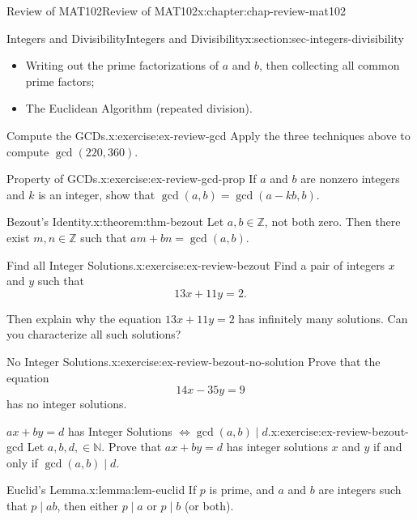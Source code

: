 \documentclass[oneside,10pt,]{book}
\numberwithin{equation}{section}
\begin{document}
\begin{chapterptx}{Review of MAT102}{}{Review of MAT102}{}{}{x:chapter:chap-review-mat102}
\begin{sectionptx}{Integers and Divisibility}{}{Integers and Divisibility}{}{}{x:section:sec-integers-divisibility}
\begin{itemize}[label=\textbullet]
\item{}Writing out the prime factorizations of \(a\) and \(b\), then collecting all common prime factors;%
\item{}The Euclidean Algorithm (repeated division).%
\end{itemize}
%
\begin{inlineexercise}{Compute the GCDs.}{x:exercise:ex-review-gcd}%
Apply the three techniques above to compute \(\gcd(220,360)\).%
\end{inlineexercise}
\begin{inlineexercise}{Property of GCDs.}{x:exercise:ex-review-gcd-prop}%
If \(a\) and \(b\) are nonzero integers and \(k\) is an integer, show that \(\gcd(a,b) = \gcd(a-kb,b)\).%
\end{inlineexercise}
\begin{theorem}{Bezout's Identity.}{}{x:theorem:thm-bezout}%
Let \(a,b \in \mathbb{Z}\), not both zero. Then there exist \(m,n \in \mathbb{Z}\) such that \(am + bn = \gcd(a,b)\).%
\end{theorem}
\begin{inlineexercise}{Find all Integer Solutions.}{x:exercise:ex-review-bezout}%
Find a pair of integers \(x\) and \(y\) such that%
\begin{equation*}
13x + 11y = 2\text{.}
\end{equation*}
%
\par
Then explain why the equation \(13x + 11y = 2\) has infinitely many solutions. Can you characterize all such solutions?%
\end{inlineexercise}
\begin{inlineexercise}{No Integer Solutions.}{x:exercise:ex-review-bezout-no-solution}%
Prove that the equation%
\begin{equation*}
14x - 35y = 9
\end{equation*}
has no integer solutions.%
\end{inlineexercise}
\begin{inlineexercise}{\(ax + by = d\) has Integer Solutions \(\Leftrightarrow \gcd(a,b) \mid d\).}{x:exercise:ex-review-bezout-gcd}%
Let \(a, b, d, \in \mathbb{N}\). Prove that \(ax + by = d\) has integer solutions \(x\) and \(y\) if and only if \(\gcd(a,b) \mid d\).%
\end{inlineexercise}
\begin{lemma}{Euclid's Lemma.}{}{x:lemma:lem-euclid}%
If \(p\) is prime, and \(a\) and \(b\) are integers such that \(p \mid ab\), then either \(p \mid a\) or \(p \mid b\) (or both).%
\end{lemma}

\end{sectionptx}
\end{chapterptx}
\end{document}

